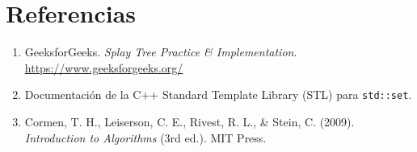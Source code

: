 \documentclass[11pt,a4paper]{article}
\begin{document}
\section{Referencias}
\begin{enumerate}
    \item GeeksforGeeks. \emph{Splay Tree Practice \& Implementation}. \url{https://www.geeksforgeeks.org/}
    \item Documentación de la C++ Standard Template Library (STL) para \texttt{std::set}.
    \item Cormen, T. H., Leiserson, C. E., Rivest, R. L., \& Stein, C. (2009). \emph{Introduction to Algorithms} (3rd ed.). MIT Press.
\end{enumerate}
\end{document}
